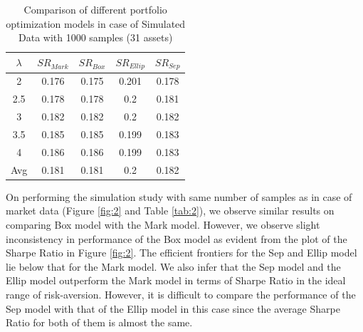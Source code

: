 \begin{table}[!h]
    \centering
    \captionsetup{justification=centering}
   \begin{tabular}{||c|c|c|c|c||}
   \hline
  
  
  $\lambda$ & $SR_{Mark}$ & $SR_{Box}$ & $SR_{Ellip}$ & $SR_{Sep}$ \\
  
  \hline
  2 & 0.176 & 0.175 & 0.201 & 0.178 \\
  2.5 & 0.178 & 0.178 & 0.2 & 0.181 \\
  3 & 0.182 & 0.182 & 0.2 & 0.182 \\
  3.5 & 0.185 & 0.185 & 0.199 & 0.183 \\
  4 & 0.186 & 0.186 & 0.199 & 0.183 \\
  \hline
  Avg & 0.181 & 0.181 & 0.2 & 0.182 \\
  \hline

\end{tabular}
    \caption{Comparison of different portfolio optimization models in case of Simulated Data with 1000 samples (31 assets)}
    \label{tab:1}
\end{table}

On performing the simulation study with same number of samples as in case of market data (Figure \ref{fig:2} and Table \ref{tab:2}), we observe similar results on comparing Box model with the Mark model. However, we observe slight inconsistency in performance of the Box model as evident from the plot of the Sharpe Ratio in Figure \ref{fig:2}. The efficient frontiers for the Sep and Ellip model lie below that for the Mark model. We also infer that the Sep model and the Ellip model outperform the Mark model in terms of Sharpe Ratio in the ideal range of risk-aversion. However, it is difficult to compare the performance of the Sep model with that of the Ellip model in this case since the average Sharpe Ratio for both of them is almost the same.

